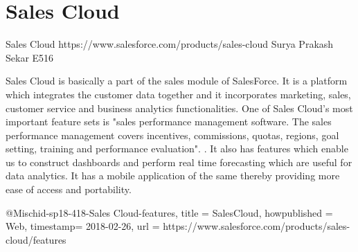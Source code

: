 \section{Sales Cloud}


Sales Cloud
https://www.salesforce.com/products/sales-cloud
Surya Prakash Sekar
E516

Sales Cloud is basically a part of the sales module of SalesForce. It is a 
platform which integrates the customer data together and it incorporates 
marketing, sales, customer service and business analytics functionalities.
One of Sales Cloud’s most important feature sets is "sales performance 
management software. The sales performance management covers incentives,
commissions, quotas, regions, goal setting, training and performance
evaluation". \cite{hid-sp18-418-SalesCloud-features}. It also has features 
which enable us to construct dashboards and perform real time forecasting 
which are useful for data analytics. It has a mobile application of the same 
thereby providing more ease of access and portability.


@Misc{hid-sp18-418-Sales Cloud-features,
title = {SalesCloud},
howpublished = {Web},
timestamp= {2018-02-26},
url = {https://www.salesforce.com/products/sales-cloud/features}
}